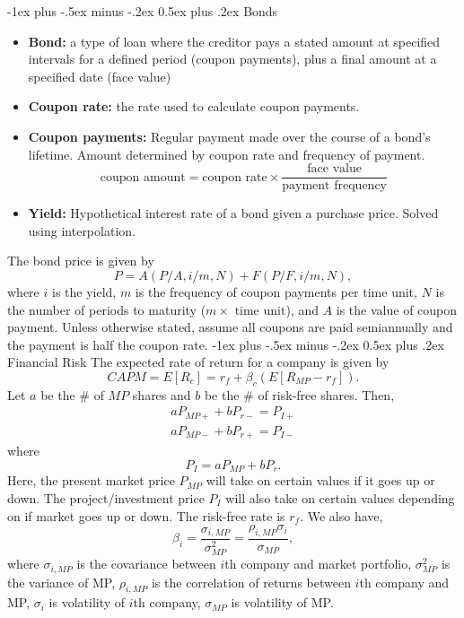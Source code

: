 \documentclass[11pt,landscape]{article}
\makeatletter
\renewcommand{\section}{\@startsection{section}{1}{0mm}%
                                {-1ex plus -.5ex minus -.2ex}%
                                {0.5ex plus .2ex}%
                                {\normalfont\large\bfseries}}
\makeatother
\begin{document}
\begin{multicols*}{3}
\section{Bonds}
\begin{itemize}
    \item \textbf{Bond:} a type of loan where the creditor pays a stated amount at specified intervals for a defined period (coupon payments), plus a final amount at a specified date (face value)
    \item \textbf{Coupon rate:} the rate used to calculate coupon payments.
    \item \textbf{Coupon payments:} Regular payment made over the course of a bond's lifetime. Amount determined by coupon rate and frequency of payment.
    \begin{equation*}
        \text{coupon amount} = \text{coupon rate} \times \frac{\text{face value}}{\text{payment frequency}}
    \end{equation*}
    \item \textbf{Yield:} Hypothetical interest rate of a bond given a purchase price. Solved using interpolation.
\end{itemize}
The bond price is given by 
\begin{equation*}
    P = A\left(P/A, i/m, N\right) + F\left(P/F, i/m, N\right),
\end{equation*}
where $i$ is the yield, $m$ is the frequency of coupon payments per time unit, $N$ is the number of periods to maturity ($m\times \text{ time unit}$), and $A$ is the value of coupon payment. Unless otherwise stated, assume all coupons are paid semiannually and the payment is half the coupon rate.
\section{Financial Risk}
The expected rate of return for a company is given by
$$CAPM = E[R_c] = r_f + \beta_c\left(E[R_{MP} - r_f]\right).$$
Let $a$ be the \# of $MP$ shares and $b$ be the \# of risk-free shares. Then,
\begin{align*}
    aP_{MP+} + bP_{r-} = P_{I+} \\ 
    aP_{MP-} + bP_{r+} = P_{I-}
\end{align*}
where
\begin{equation*}
    P_I = aP_{MP} + bP_r.
\end{equation*}
Here, the present market price $P_{MP}$ will take on certain values if it goes up or down. The project/investment price $P_I$ will also take on certain values depending on if market goes up or down. The risk-free rate is $r_f.$ We also have,
\begin{equation*}
    \beta_i = \frac{\sigma_{i,MP}}{\sigma_{MP}^2} = \frac{\rho_{i,MP}\sigma_i}{\sigma_{MP}},
\end{equation*}
where $\sigma_{i,MP}$ is the covariance between $i$th company and market portfolio, $\sigma_{MP}^2$ is the variance of MP, $\rho_{i,MP}$ is the correlation of returns between $i$th company and MP, $\sigma_i$ is volatility of $i$th company, $\sigma_{MP}$ is volatility of MP.

\end{multicols*}
\end{document}
